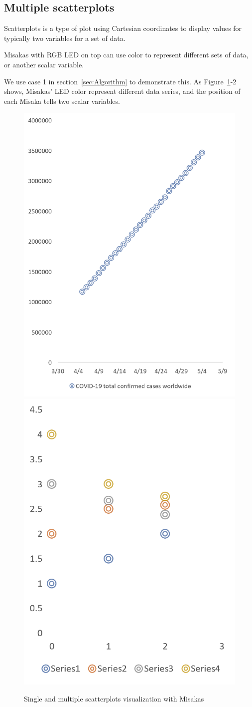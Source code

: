 \documentclass[conference]{IEEEtran}
\begin{document}
\subsection{Multiple scatterplots}

Scatterplots is a type of plot using Cartesian coordinates to display values for typically two variables for a set of data. 




Misakas with RGB LED on top can use color to represent different sets of data, or another scalar variable.

We use case 1 in section~\ref{sec:Algorithm} to demonstrate this. As Figure~\ref{fig:scatterplots1}-2 shows, Misakas’ LED color represent different data series, and the position of each Misaka tells two scalar variables. 

\begin{figure}[htbp]
    \centering
    \includegraphics[width=0.49\columnwidth]{scatterplots02.png}
    \includegraphics[width=0.49\columnwidth]{scatterplots01.png}
    \caption{Single and multiple scatterplots visualization with Misakas}
    \label{fig:scatterplots1}
\end{figure}
\end{document}

